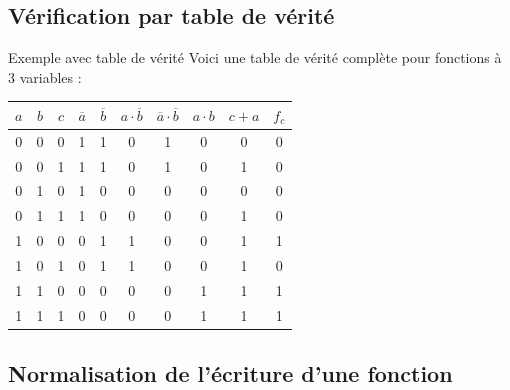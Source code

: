 \documentclass[a4paper,12pt]{article}
\begin{document}
\subsection{Vérification par table de vérité}

\begin{examplebox}{Exemple avec table de vérité}
Voici une table de vérité complète pour fonctions à 3 variables :

\vspace{0.5cm}
\begin{center}
\begin{tabular}{|c|c|c|c|c|c|c|c|c|c|}
\hline
$a$ & $b$ & $c$ & $\overline{a}$ & $\overline{b}$ & $a \cdot \overline{b}$ & $\overline{a} \cdot \overline{b}$ & $a \cdot b$ & $c + a$ & $f_c$ \\
\hline
0 & 0 & 0 & 1 & 1 & 0 & 1 & 0 & 0 & 0 \\
\hline
0 & 0 & 1 & 1 & 1 & 0 & 1 & 0 & 1 & 0 \\
\hline
0 & 1 & 0 & 1 & 0 & 0 & 0 & 0 & 0 & 0 \\
\hline
0 & 1 & 1 & 1 & 0 & 0 & 0 & 0 & 1 & 0 \\
\hline
1 & 0 & 0 & 0 & 1 & 1 & 0 & 0 & 1 & 1 \\
\hline
1 & 0 & 1 & 0 & 1 & 1 & 0 & 0 & 1 & 0 \\
\hline
1 & 1 & 0 & 0 & 0 & 0 & 0 & 1 & 1 & 1 \\
\hline
1 & 1 & 1 & 0 & 0 & 0 & 0 & 1 & 1 & 1 \\
\hline
\end{tabular}
\end{center}
\end{examplebox}

\subsection{Normalisation de l'écriture d'une fonction}
\end{document}

